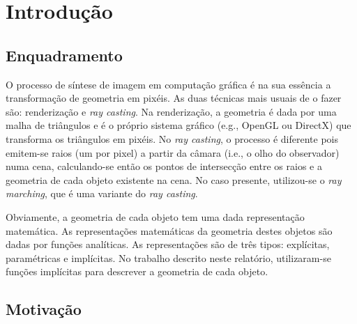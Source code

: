 \chapter{Introdução}
\label{ch::intro}

\section{Enquadramento}
\label{sec::intro:enquadramento}

%


O processo de síntese de imagem em computação gráfica é na sua essência a transformação de geometria em pixéis. 
As duas técnicas mais usuais de o fazer são: renderização e \emph{ray casting}. Na renderização, a geometria é dada por uma malha de triângulos
e é o próprio sistema gráfico (e.g., OpenGL ou DirectX) que transforma os triângulos em pixéis. 
No \emph{ray casting}, o processo é diferente pois emitem-se raios (um por pixel) a partir da câmara (i.e., o olho do observador) numa cena, calculando-se então os pontos de intersecção entre os raios e a geometria de cada objeto existente na cena. 
No caso presente, utilizou-se o \emph{ray marching}, que é uma variante do \emph{ray casting}.

Obviamente, a geometria de cada objeto tem uma dada representação matemática. As representações matemáticas da geometria destes objetos são dadas por funções analíticas. As representações são de três tipos: explícitas, paramétricas e implícitas. No trabalho descrito neste relatório, utilizaram-se funções implícitas para descrever a geometria de cada objeto.


\section{Motivação}
\label{sec::intro:motivacao}

